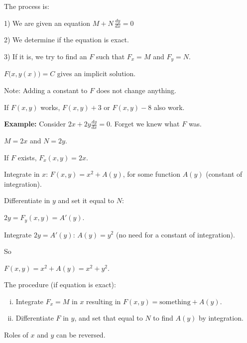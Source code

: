 \documentclass[10pt,aspectratio=169]{beamer}
\begin{document}
\begin{frame}
The process is:

\medskip

1) We are given an equation
\quad
$M + N \, \frac{dy}{dx} = 0$

\medskip
\pause

2) We determine if the equation is exact.

\medskip
\pause

3) If it is, we try to find an $F$ such that $F_x = M$
and $F_y = N$.

\medskip
\pause

$F\bigl(x,y(x)\bigr) = C$ gives an implicit solution.

\medskip
\pause

Note: Adding a constant to $F$ does not change anything.

\pause
If $F(x,y)$ works, $F(x,y)+3$ or $F(x,y)-8$ also work.

\end{frame}

\begin{frame}

\textbf{Example:}
Consider \quad $2x + 2y \frac{dy}{dx} = 0$. \quad  Forget we knew
what $F$ was.

\medskip
\pause

$M = 2x$ and $N=2y$.

\medskip
\pause

If $F$ exists, $F_x (x,y) = 2x$.

\medskip
\pause

Integrate in $x$:
\quad
$F(x,y) = x^2 + A(y)$,
\quad
for some function $A(y)$ (constant of integration).

\medskip
\pause

Differentiate in $y$ and set it equal to $N$:

\medskip
\quad
$2y = F_y (x,y) = A'(y)$.

\medskip
\pause

Integrate $2y=A'(y)$: \quad
$A(y) = y^2$ \quad (no need for a constant of integration).

\medskip
\pause

So

\medskip

\quad
$F(x,y) = x^2 + A(y) = x^2+y^2$.

\end{frame}

\begin{frame}

The procedure (if equation is exact):
\begin{enumerate}[(i)]
\item
\pause
Integrate $F_x = M$ in $x$ resulting in $F(x,y) = \text{something} + A(y)$.
\item
\pause
Differentiate $F$ in $y$, and set that equal to
$N$ to find $A(y)$ by integration.
\end{enumerate}
\pause
Roles of $x$ and $y$ can be reversed.

\end{frame}
\end{document}
